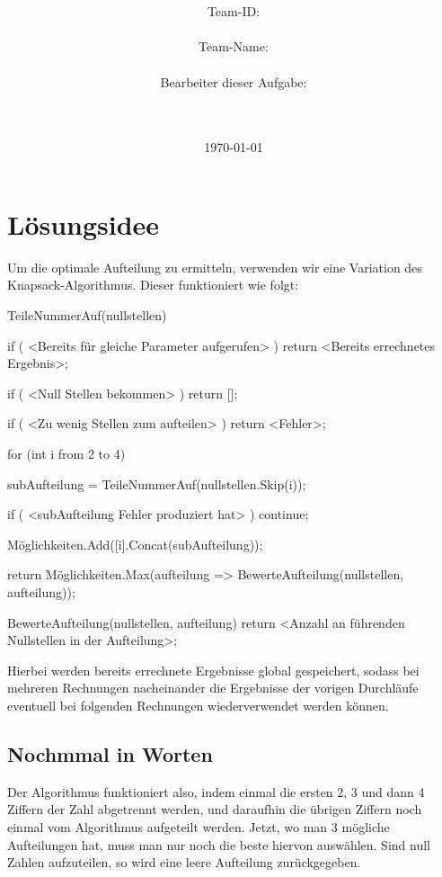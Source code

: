 \documentclass[a4paper,10pt,ngerman]{scrartcl}
\title{\textbf{\Huge\Aufgabe}}
\author{\LARGE Team-ID: \LARGE \TeamID \\\\
        \LARGE Team-Name: \LARGE \TeamName \\\\
        \LARGE Bearbeiter dieser Aufgabe: \\ 
        \LARGE \Namen\\\\}
\date{\LARGE\today}
\begin{document}
\maketitle
\tableofcontents

\section{Lösungsidee} \label{idea}

Um die optimale Aufteilung zu ermitteln,
verwenden wir eine Variation des Knapsack-Algorithmus.
Dieser funktioniert wie folgt:

\begin{lstcs}
TeileNummerAuf(nullstellen) {
    if ( <Bereits für gleiche Parameter aufgerufen> ) {
        return <Bereits errechnetes Ergebnis>;
    }
    
    if ( <Null Stellen bekommen> ) {
      return [];
    }

    if ( <Zu wenig Stellen zum aufteilen> ) {
        return <Fehler>;
    }

    for (int i from 2 to 4) {
        subAufteilung = TeileNummerAuf(nullstellen.Skip(i));

            if ( <subAufteilung Fehler produziert hat> ) continue;
        
        Möglichkeiten.Add([i].Concat(subAufteilung));
    }

    return Möglichkeiten.Max(aufteilung => BewerteAufteilung(nullstellen, aufteilung));
}

BewerteAufteilung(nullstellen, aufteilung) {
    return <Anzahl an führenden Nullstellen in der Aufteilung>;
}
\end{lstcs}

Hierbei werden bereits errechnete Ergebnisse global gespeichert,
sodass bei mehreren Rechnungen nacheinander die Ergebnisse der vorigen
Durchläufe eventuell bei folgenden Rechnungen wiederverwendet werden können.

\subsection{Nochmmal in Worten}

Der Algorithmus funktioniert also, indem einmal die ersten 2, 3 und dann 4
Ziffern der Zahl abgetrennt werden, und daraufhin die übrigen Ziffern
noch einmal vom Algorithmus aufgeteilt werden.
Jetzt, wo man 3 mögliche Aufteilungen hat, muss man nur noch die beste
hiervon auswählen.
Sind null Zahlen aufzuteilen, so wird eine leere Aufteilung zurückgegeben.
\end{document}
